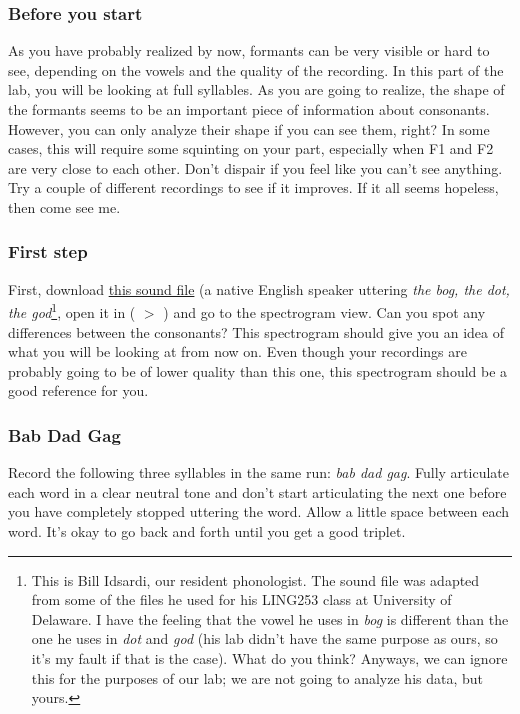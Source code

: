 \subsubsection{Before you start}

As you have probably realized by now, formants can be very visible or hard to see, depending on the vowels and the quality of the recording. In this part of the lab, you will be looking at full syllables. As you are going to realize, the shape of the formants seems to be an important piece of information about consonants. However, you can only analyze their shape if you can see them, right? In some cases, this will require some squinting on your part, especially when F1 and F2 are very close to each other. Don't dispair if you feel like you can't see anything. Try a couple of different recordings to see if it improves. If it all seems hopeless, then come see me.

\subsubsection{First step}

First, download \href{http://www.ling.umd.edu/~diogo/courses/ling499a/thebog-thedot-thegod.wav}{this sound file} (a native English speaker uttering \emph{the bog, the dot, the god}\footnote{This is Bill Idsardi, our resident phonologist. The sound file was adapted from some of the files he used for his LING253 class at University of Delaware. I have the feeling that the vowel he uses in \emph{bog} is different than the one he uses in \emph{dot} and \emph{god} (his lab didn't have the same purpose as ours, so it's my fault if that is the case). What do you think? Anyways, we can ignore this for the purposes of our lab; we are not going to analyze his data, but yours.}, open it in \Praat{} ( $>$ ) and go to the spectrogram view. Can you spot any differences between the consonants? This spectrogram should give you an idea of what you will be looking at from now on. Even though your recordings are probably going to be of lower quality than this one, this spectrogram should be a good reference for you.

\subsubsection{Bab Dad Gag}

Record the following three syllables in the same run: \emph{bab dad gag}. Fully articulate each word in a clear neutral tone and don't start articulating the next one before you have completely stopped uttering the word. Allow a little space between each word. It's okay to go back and forth until you get a good triplet.


